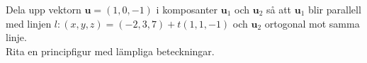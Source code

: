 \documentclass[11pt]{article}
\begin{document}
Dela upp vektorn $\mathbf{u} = (1, 0, -1)$ i komposanter $\mathbf{u}_1$ och $\mathbf{u}_2$ så att $\mathbf{u}_1$ blir parallell med linjen $l : (x, y, z) = (-2, 3, 7) + t(1, 1, -1)$ och $\mathbf{u}_2$ ortogonal mot samma linje.\\
Rita en principfigur med lämpliga beteckningar.
\end{document}
